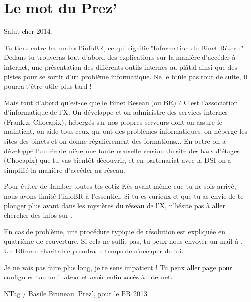 \thispagestyle{empty}

\section*{Le mot du Prez'}

\vspace{1em}

Salut cher 2014,
\vspace{0.5em}

Tu tiens entre tes mains l'infoBR, ce qui signifie "Information du Binet Réseau". Dedans tu trouveras tout d'abord des explications sur la manière d'accéder à internet, une présentation des différents outils internes au plâtal ainsi que des pistes pour se sortir d'un problème informatique. Ne le brûle pas tout de suite, il pourra t'être utile plus tard !

Mais tout d'abord qu'est-ce que le Binet Réseau (ou BR) ? C'est l'association d'informatique de l'X. On développe et on administre des services internes (Frankiz, Chocapix), hébergés sur nos propres serveurs dont on assure le maintient, on aide tous ceux qui ont des problèmes informatiques, on héberge les sites des binets et on donne régulièrement des formations... En outre on a développé l'année dernière une toute nouvelle version du site des bars d'étages (Chocapix) que tu vas bientôt découvrir, et en partenariat avec la DSI on a simplifié la manière d'accéder au réseau.

Pour éviter de flamber toutes tes cotiz Kès avant même que tu ne sois arrivé, nous avons limité l'infoBR à l'essentiel. Si tu es curieux et que tu as envie de te plonger plus avant dans les mystères du réseau de l'X, n'hésite pas à aller chercher des infos sur .

\vspace{1em}
En cas de problème, une procédure typique de résolution est expliquée en quatrième de couverture. Si cela ne suffit pas, tu peux nous envoyer un mail à . Un BRman charitable prendra le temps de s'occuper de toi.

Je ne vais pas faire plus long, je te sens impatient ! Tu peux aller page \pageref{windows} pour configurer ton ordinateur et avoir enfin accès à internet.

\vspace{2.5em}
\hfill NTag / Basile Bruneau, Prez', pour le BR 2013


\vfill


